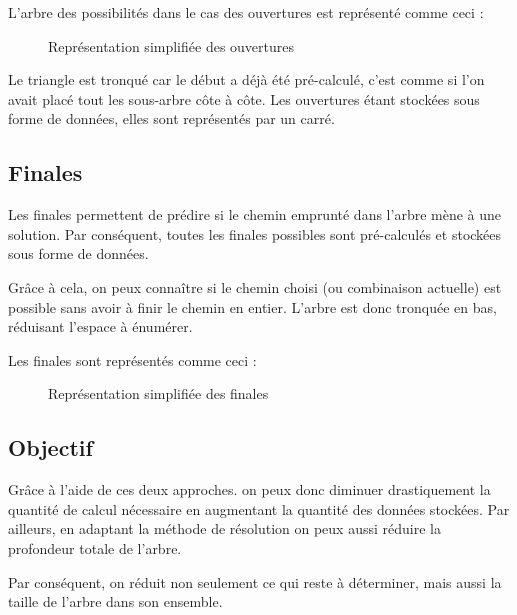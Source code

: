 	L'arbre des possibilités dans le cas des ouvertures est représenté comme ceci :
	
	\begin{figure}[H]
		\begin{center}
				
		\end{center}
		
		\caption{Représentation simplifiée des ouvertures}
		\label{fig:ouvertures}
	\end{figure}
		
	Le triangle  est tronqué car le début a déjà été pré-calculé, c'est comme si l'on avait placé tout les sous-arbre côte à côte. Les ouvertures étant stockées sous forme de données, elles sont représentés par un carré.
\newpage

	\subsection{Finales}

	Les finales permettent de prédire si le chemin emprunté dans l'arbre mène à une solution. Par conséquent, toutes les finales possibles sont pré-calculés et stockées sous forme de données.
	
	Grâce à cela, on peux connaître si le chemin choisi (ou combinaison actuelle) est possible sans avoir à finir le chemin en entier. L'arbre est donc tronquée en bas, réduisant l'espace à énumérer.
	
	Les finales sont représentés comme ceci :
	
	\begin{figure}[H]
		\begin{center}
				
		\end{center}
		
		\caption{Représentation simplifiée des finales}
		\label{fig:finales}
	\end{figure}
	\newpage
	
	\subsection{Objectif}
	
	Grâce à l'aide de ces deux approches. on peux donc diminuer drastiquement la quantité de calcul nécessaire en augmentant la quantité des données stockées. Par ailleurs, en adaptant la méthode de résolution on peux aussi réduire la profondeur totale de l'arbre.
	
	Par conséquent, on réduit non seulement ce qui reste à déterminer, mais aussi la taille de l'arbre dans son ensemble.
	
